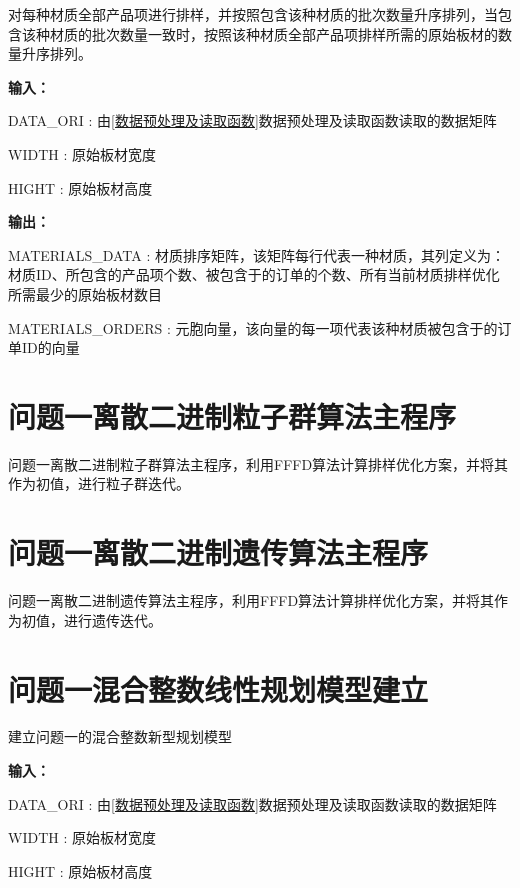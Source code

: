 \documentclass[bwprint]{gmcmthesis}
\begin{document}
对每种材质全部产品项进行排样，并按照包含该种材质的批次数量升序排列，当包含该种材质的批次数量一致时，按照该种材质全部产品项排样所需的原始板材的数量升序排列。

\textbf{输入：} 

DATA\_ORI : 由\ref{数据预处理及读取函数}数据预处理及读取函数读取的数据矩阵

WIDTH : 原始板材宽度

HIGHT : 原始板材高度

\textbf{输出：} 

MATERIALS\_DATA : 材质排序矩阵，该矩阵每行代表一种材质，其列定义为：材质ID、所包含的产品项个数、被包含于的订单的个数、所有当前材质排样优化所需最少的原始板材数目

MATERIALS\_ORDERS : 元胞向量，该向量的每一项代表该种材质被包含于的订单ID的向量




\newpage
\section{问题一离散二进制粒子群算法主程序}

问题一离散二进制粒子群算法主程序，利用FFFD算法计算排样优化方案，并将其作为初值，进行粒子群迭代。



\newpage
\section{问题一离散二进制遗传算法主程序}

问题一离散二进制遗传算法主程序，利用FFFD算法计算排样优化方案，并将其作为初值，进行遗传迭代。




\newpage
\section{问题一混合整数线性规划模型建立}

建立问题一的混合整数新型规划模型

\textbf{输入：} 

DATA\_ORI : 由\ref{数据预处理及读取函数}数据预处理及读取函数读取的数据矩阵

WIDTH : 原始板材宽度

HIGHT : 原始板材高度
\end{document}
